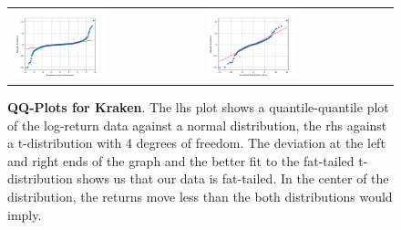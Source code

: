 \documentclass[english,11pt]{article}
\begin{document}
\begin{figure}[h]
    \center
    \begin{tabular}{ll}
    \includegraphics[width=0.5\textwidth]{qq_normal_kraken.png} &
    \includegraphics[width=0.5\textwidth]{qq_tdist_kraken.png} \\
    \end{tabular}
    \caption{\textbf{QQ-Plots for Kraken}. The lhs plot shows a quantile-quantile plot
    of the log-return data against a normal distribution, the rhs
    against a t-distribution with 4 degrees of freedom.
    The deviation at the left and right ends of the graph and the better 
    fit to the fat-tailed t-distribution shows us that our data
    is fat-tailed. In the center of the distribution, the 
    returns move less than the both distributions would imply.}\label{fig:qqplots}
\end{figure}
\end{document}
